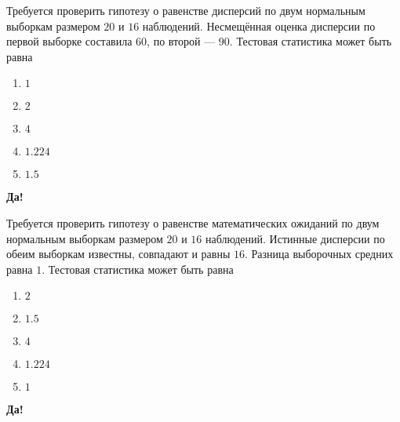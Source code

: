 \documentclass[t]{beamer}
\begin{document}
 \begin{frame} \label{3-Yes} 
\begin{block}{3} 

  Требуется проверить гипотезу о равенстве дисперсий по двум нормальным выборкам размером $20$ и $16$ наблюдений. Несмещённая оценка дисперсии по первой выборке составила $60$, по второй — $90$. Тестовая статистика может быть равна
  


 \end{block} 
\begin{enumerate} 
\item[] \hyperlink{3-No}{\beamergotobutton{} $1$}
\item[] \hyperlink{3-No}{\beamergotobutton{} $2$}
\item[] \hyperlink{3-No}{\beamergotobutton{} $4$}
\item[] \hyperlink{3-No}{\beamergotobutton{} $1.224$}
\item[] \hyperlink{3-Yes}{\beamergotobutton{} $1.5$}
\end{enumerate} 

 \textbf{Да!} 
 \hyperlink{4}{}\end{frame} 


 \begin{frame} \label{4-Yes} 
\begin{block}{4} 

  Требуется проверить гипотезу о равенстве математических ожиданий по двум нормальным выборкам размером $20$ и $16$ наблюдений. Истинные дисперсии по обеим выборкам известны, совпадают и равны $16$. Разница выборочных средних равна $1$. Тестовая статистика может быть равна
  


 \end{block} 
\begin{enumerate} 
\item[] \hyperlink{4-No}{\beamergotobutton{} $2$}
\item[] \hyperlink{4-No}{\beamergotobutton{} $1.5$}
\item[] \hyperlink{4-No}{\beamergotobutton{} $4$}
\item[] \hyperlink{4-No}{\beamergotobutton{} $1.224$}
\item[] \hyperlink{4-No}{\beamergotobutton{} $1$}
\end{enumerate} 

 \textbf{Да!} 
 \hyperlink{5}{}\end{frame} 
\end{document}
